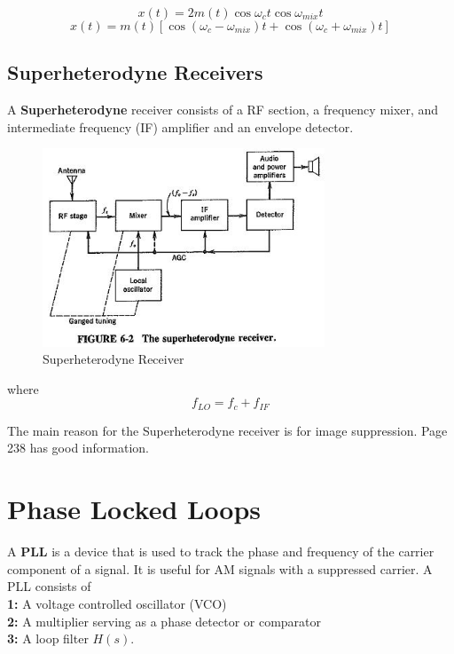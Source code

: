 \documentclass{article}
\begin{document}
    \begin{equation}
        x(t) = 2m(t)\cos\omega_ct\cos\omega_{mix}t
    \end{equation}
    \begin{equation}
        x(t) = m(t)[\cos(\omega_c -\omega_{mix})t + \cos(\omega_c + \omega_{mix})t]
    \end{equation}

    \subsection{Superheterodyne Receivers}
    A \textbf{Superheterodyne} receiver consists of a RF section, a frequency mixer, and intermediate frequency (IF) amplifier and an envelope detector. 

    \begin{figure}[h]
        \centering
        \includegraphics[width=0.75\textwidth]{shr}
        \caption{Superheterodyne Receiver}
    \end{figure}
    where 
    \begin{equation}
        f_{LO} = f_c + f_{IF}
    \end{equation}

    The main reason for the Superheterodyne receiver is for image suppression. Page 238 has good information. 

    \section{Phase Locked Loops}
    A \textbf{PLL} is a device that is used to track the phase and frequency of the carrier component of a signal. It is useful for AM signals with a suppressed
    carrier. A PLL consists of \\
    \textbf{1: } A voltage controlled oscillator (VCO) \\
    \textbf{2: } A multiplier serving as a phase detector or comparator \\
    \textbf{3: } A loop filter $H(s)$.
\end{document}
